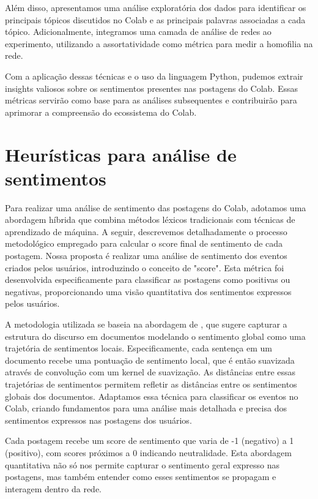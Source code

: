 Além disso, apresentamos uma análise exploratória dos dados para identificar os principais tópicos discutidos no Colab e as principais palavras associadas a cada tópico. Adicionalmente, integramos uma camada de análise de redes ao experimento, utilizando a assortatividade como métrica para medir a homofilia na rede.

Com a aplicação dessas técnicas e o uso da linguagem Python, pudemos extrair insights valiosos sobre os sentimentos presentes nas postagens do Colab. Essas métricas servirão como base para as análises subsequentes e contribuirão para aprimorar a compreensão do ecossistema do Colab.

\section{Heurísticas para análise de sentimentos}

Para realizar uma análise de sentimento das postagens do Colab, adotamos uma abordagem híbrida que combina métodos léxicos tradicionais com técnicas de aprendizado de máquina. A seguir, descrevemos detalhadamente o processo metodológico empregado para calcular o score final de sentimento de cada postagem. Nossa proposta é realizar uma análise de sentimento dos eventos criados pelos usuários, introduzindo o conceito de "score". Esta métrica foi desenvolvida especificamente para classificar as postagens como positivas ou negativas, proporcionando uma visão quantitativa dos sentimentos expressos pelos usuários. 

A metodologia utilizada se baseia na abordagem de , que sugere capturar a estrutura do discurso em documentos modelando o sentimento global como uma trajetória de sentimentos locais. Especificamente, cada sentença em um documento recebe uma pontuação de sentimento local, que é então suavizada através de convolução com um kernel de suavização. As distâncias entre essas trajetórias de sentimentos permitem refletir as distâncias entre os sentimentos globais dos documentos. Adaptamos essa técnica para classificar os eventos no Colab, criando fundamentos para uma análise mais detalhada e precisa dos sentimentos expressos nas postagens dos usuários. 

Cada postagem recebe um score de sentimento que varia de -1 (negativo) a 1 (positivo), com scores próximos a 0 indicando neutralidade. Esta abordagem quantitativa não só nos permite capturar o sentimento geral expresso nas postagens, mas também entender como esses sentimentos se propagam e interagem dentro da rede.

